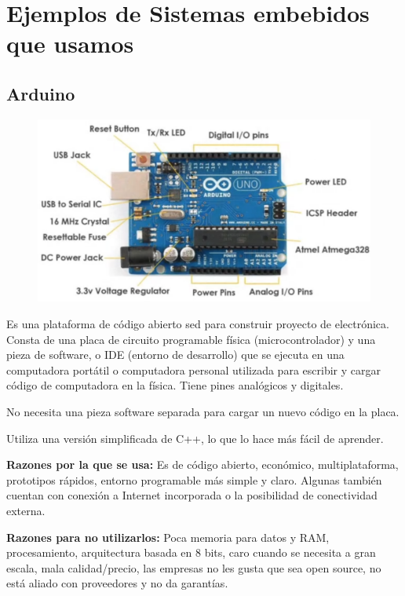\documentclass[12pt]{report} %
\begin{document}
\section{Ejemplos de Sistemas embebidos que usamos}
\subsection{Arduino}

\begin{figure}[H]
	{\includegraphics[scale=.5]{2021-03-19 17_31_12-DSO Elementos Sistema embebido.mkv.png}}
\end{figure}


Es una plataforma de código abierto sed para construir proyecto de electrónica.	Consta de una placa de circuito programable física (microcontrolador) y una pieza de software, o IDE (entorno de desarrollo) que se ejecuta en una computadora portátil o computadora personal utilizada para escribir y cargar código de computadora en la física. Tiene pines analógicos y digitales.
	
No necesita una pieza software separada para cargar un nuevo código en la placa.
	
Utiliza una versión simplificada de C++, lo que lo hace más fácil de aprender.
	
\textbf{Razones por la que se usa:} Es de código abierto, económico, multiplataforma, prototipos rápidos, entorno programable más simple y claro. Algunas también cuentan con conexión a Internet incorporada o la posibilidad de conectividad externa.
	
\textbf{Razones para no utilizarlos:} Poca memoria para datos y RAM, procesamiento, arquitectura basada en 8 bits, caro cuando se necesita a gran escala, mala calidad/precio, las empresas no les gusta que sea open source, no está aliado con proveedores y no da garantías.
\end{document}
